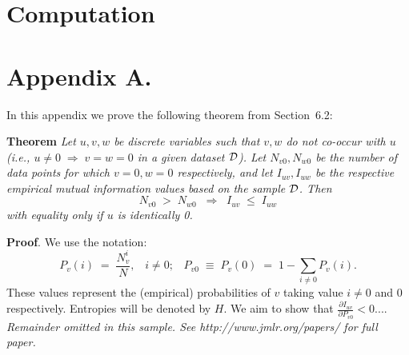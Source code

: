 \documentclass[twoside,11pt]{article}
\newcommand{\dataset}{{\cal D}}
\newcommand{\fracpartial}[2]{\frac{\partial #1}{\partial  #2}}
\begin{document}
\section{Computation}



\newpage

\appendix
\section*{Appendix A.}
\label{app:theorem}



In this appendix we prove the following theorem from
Section~6.2:

\noindent
{\bf Theorem} {\it Let $u,v,w$ be discrete variables such that $v, w$ do
not co-occur with $u$ (i.e., $u\neq0\;\Rightarrow \;v=w=0$ in a given
dataset $\dataset$). Let $N_{v0},N_{w0}$ be the number of data points for
which $v=0, w=0$ respectively, and let $I_{uv},I_{uw}$ be the
respective empirical mutual information values based on the sample
$\dataset$. Then
\[
	N_{v0} \;>\; N_{w0}\;\;\Rightarrow\;\;I_{uv} \;\leq\;I_{uw}
\]
with equality only if $u$ is identically 0.} \hfill\BlackBox

\noindent
{\bf Proof}. We use the notation:
\[
P_v(i) \;=\;\frac{N_v^i}{N},\;\;\;i \neq 0;\;\;\;
P_{v0}\;\equiv\;P_v(0)\; = \;1 - \sum_{i\neq 0}P_v(i).
\]
These values represent the (empirical) probabilities of $v$
taking value $i\neq 0$ and 0 respectively.  Entropies will be denoted
by $H$. We aim to show that $\fracpartial{I_{uv}}{P_{v0}} < 0$....\\

{\noindent \em Remainder omitted in this sample. See http://www.jmlr.org/papers/ for full paper.}


\vskip 0.2in

\end{document}
